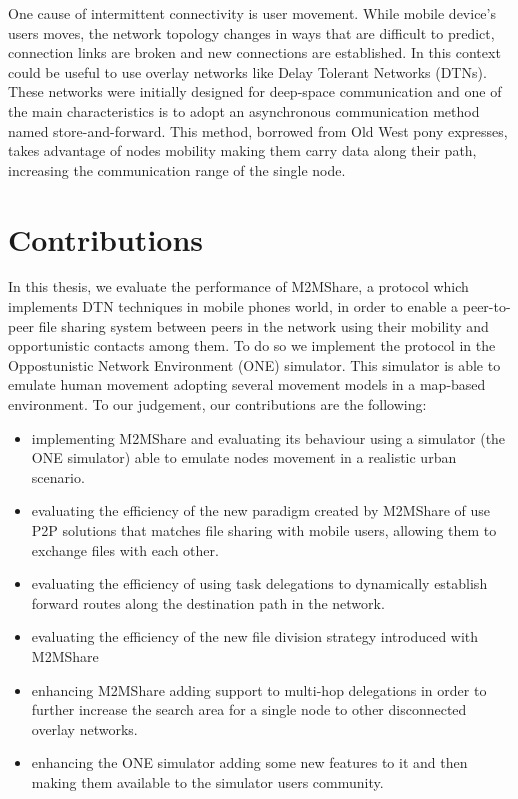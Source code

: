 One cause of intermittent connectivity is user movement. While mobile device's users moves, the network topology changes in ways that are difficult to predict, connection links are broken and new connections are established. In this context could be useful to use overlay networks like Delay Tolerant Networks (DTNs). These networks were initially designed for deep-space communication and one of the main characteristics is to adopt an asynchronous communication method named store-and-forward. This method, borrowed from Old West pony expresses, takes advantage of nodes mobility making them carry data along their path, increasing the communication range of the single node.



\section{Contributions}
In this thesis, we evaluate the performance of M2MShare, a protocol which implements DTN techniques in mobile phones world, in order to enable a peer-to-peer file sharing system between peers in the network using their mobility and opportunistic contacts among them. To do so we implement the protocol in the Oppostunistic Network Environment (ONE) simulator. This simulator is able to emulate human movement adopting several movement models in a map-based environment. To our judgement, our contributions are the following:
\begin{itemize}
\item implementing M2MShare and evaluating its behaviour using a simulator (the ONE simulator) able to emulate nodes movement in a realistic urban scenario.
\item evaluating the efficiency of the new paradigm created by M2MShare of use P2P solutions that matches file sharing with mobile users, allowing them to exchange files with each other.
\item evaluating the efficiency of using task delegations to dynamically establish forward routes along the destination path in the network.
\item evaluating the efficiency of the new file division strategy introduced with M2MShare 
\item enhancing M2MShare adding support to multi-hop delegations in order to further increase the search area for a single node to other disconnected overlay networks.
\item enhancing the ONE simulator adding some new features to it and then making them available to the simulator users community.
\end{itemize}

